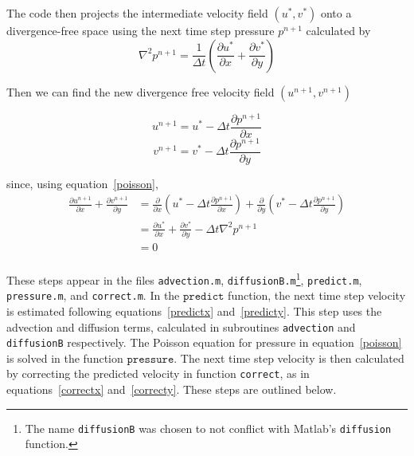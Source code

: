 \documentclass[12pt]{article}
\begin{document}
The code then projects the intermediate velocity field $(u^*,v^*)$ onto a divergence-free space using the next time step pressure $p^{n+1}$ calculated by
\begin{equation}
\nabla^2 p^{n+1} = \frac{1}{\Delta t}\left( \frac{\partial u^*}{\partial x} + \frac{\partial v^*}{\partial y} \right)
\label{poisson}
\end{equation}

Then we can find the new divergence free velocity field $(u^{n+1},v^{n+1})$ 

\begin{equation}
u^{n+1}= u^* - \Delta t\frac{\partial p^{n+1}}{\partial x}
\label{correctx}
\end{equation}
\begin{equation}
v^{n+1}= v^* - \Delta t\frac{\partial p^{n+1}}{\partial y}
\label{correcty}
\end{equation}

since, using equation~\ref{poisson},
\begin{align*}
\frac{\partial  u^{n+1}}{\partial x} +  \frac{\partial  v^{n+1}}{\partial y}&= \frac{\partial}{\partial x}\left(u^* - \Delta t\frac{\partial p^{n+1}}{\partial x} \right) + \frac{\partial}{\partial y}\left(v^* - \Delta t\frac{\partial p^{n+1}}{\partial y} \right)\\
&= \frac{\partial u^*}{\partial x} + \frac{\partial v^*}{\partial y} - \Delta t\nabla^2p^{n+1} \\
&= 0 \\
\end{align*}

These steps appear in the files \texttt{advection.m}, \texttt{diffusionB.m}\footnote{The name \texttt{diffusionB} was chosen to not conflict with Matlab's \texttt{diffusion} function.}, \texttt{predict.m}, \texttt{pressure.m}, and \texttt{correct.m}.  In the $\texttt{predict}$ function, the next time step velocity is estimated following equations~\ref{predictx} and~\ref{predicty}.  This step uses the advection and diffusion terms, calculated in subroutines \texttt{advection} and \texttt{diffusionB} respectively.  The Poisson equation for pressure in equation~\ref{poisson} is solved in the function $\texttt{pressure}$.  The next time step velocity is then calculated by correcting the predicted velocity in function \texttt{correct}, as in equations~\ref{correctx} and~\ref{correcty}.  These steps are outlined below.
\end{document}
